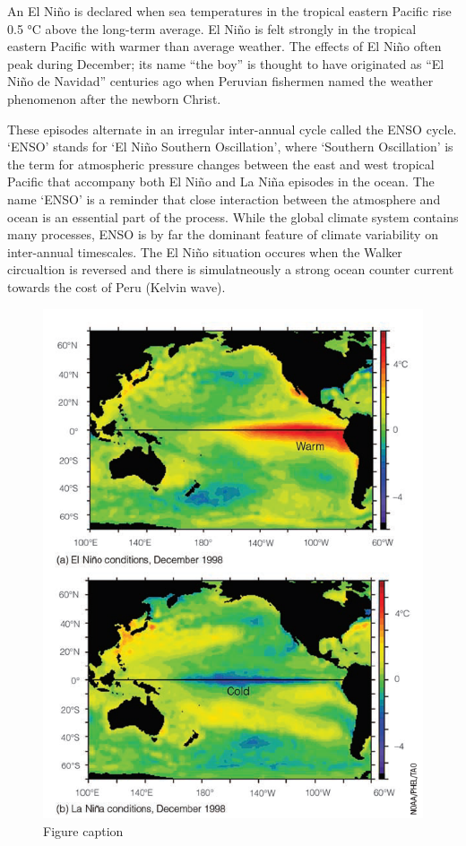 \documentclass[12pt,oneside]{book}
\begin{document}
An El Niño is declared when sea temperatures in the tropical eastern
Pacific rise 0.5 °C above the long-term average. El Niño is felt
strongly in the tropical eastern Pacific with warmer than average
weather. The effects of El Niño often peak during December; its name
``the boy'' is thought to have originated as ``El Niño de Navidad''
centuries ago when Peruvian fishermen named the weather phenomenon after
the newborn Christ.

These episodes alternate in an irregular inter-annual cycle called the
ENSO cycle. `ENSO' stands for `El Niño Southern Oscillation', where
`Southern Oscillation' is the term for atmospheric pressure changes
between the east and west tropical Pacific that accompany both El Niño
and La Niña episodes in the ocean. The name `ENSO' is a reminder that
close interaction between the atmosphere and ocean is an essential part
of the process. While the global climate system contains many processes,
ENSO is by far the dominant feature of climate variability on
inter-annual timescales. The El Niño situation occures when the Walker
circualtion is reversed and there is simulatneously a strong ocean
counter current towards the cost of Peru (Kelvin wave).

\begin{figure}

{\centering \includegraphics[width=0.8\linewidth]{figures/Figure533c} 

}

\caption{Figure caption}\label{fig:Fig533c}
\end{figure}
\end{document}
